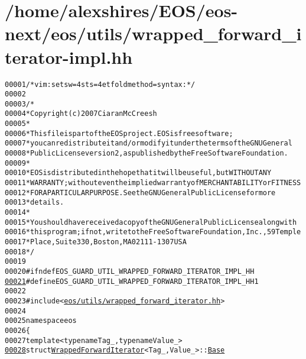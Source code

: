 \hypertarget{wrapped__forward__iterator-impl_8hh_source}{
\section{/home/alexshires/EOS/eos-\/next/eos/utils/wrapped\_\-forward\_\-iterator-\/impl.hh}
}


\begin{footnotesize}\begin{alltt}
00001 \textcolor{comment}{/* vim: set sw=4 sts=4 et foldmethod=syntax : */}
00002 
00003 \textcolor{comment}{/*}
00004 \textcolor{comment}{ * Copyright (c) 2007 Ciaran McCreesh}
00005 \textcolor{comment}{ *}
00006 \textcolor{comment}{ * This file is part of the EOS project. EOS is free software;}
00007 \textcolor{comment}{ * you can redistribute it and/or modify it under the terms of the GNU General}
00008 \textcolor{comment}{ * Public License version 2, as published by the Free Software Foundation.}
00009 \textcolor{comment}{ *}
00010 \textcolor{comment}{ * EOS is distributed in the hope that it will be useful, but WITHOUT ANY}
00011 \textcolor{comment}{ * WARRANTY; without even the implied warranty of MERCHANTABILITY or FITNESS}
00012 \textcolor{comment}{ * FOR A PARTICULAR PURPOSE.  See the GNU General Public License for more}
00013 \textcolor{comment}{ * details.}
00014 \textcolor{comment}{ *}
00015 \textcolor{comment}{ * You should have received a copy of the GNU General Public License along with}
00016 \textcolor{comment}{ * this program; if not, write to the Free Software Foundation, Inc., 59 Temple}
00017 \textcolor{comment}{ * Place, Suite 330, Boston, MA  02111-1307  USA}
00018 \textcolor{comment}{ */}
00019 
00020 \textcolor{preprocessor}{#ifndef EOS\_GUARD\_UTIL\_WRAPPED\_FORWARD\_ITERATOR\_IMPL\_HH}
\hypertarget{wrapped__forward__iterator-impl_8hh_source_l00021}{}\hyperlink{wrapped__forward__iterator-impl_8hh_af72bfca179e2f80dcfff5264bfeaa9fc}{00021} \textcolor{preprocessor}{}\textcolor{preprocessor}{#define EOS\_GUARD\_UTIL\_WRAPPED\_FORWARD\_ITERATOR\_IMPL\_HH 1}
00022 \textcolor{preprocessor}{}
00023 \textcolor{preprocessor}{#include <\hyperlink{wrapped__forward__iterator_8hh}{eos/utils/wrapped_forward_iterator.hh}>}
00024 
00025 \textcolor{keyword}{namespace }eos
00026 \{
00027     \textcolor{keyword}{template} <\textcolor{keyword}{typename} Tag\_, \textcolor{keyword}{typename} Value\_>
\hypertarget{wrapped__forward__iterator-impl_8hh_source_l00028}{}\hyperlink{structeos_1_1WrappedForwardIterator_1_1Base}{00028}     \textcolor{keyword}{struct }\hyperlink{classeos_1_1WrappedForwardIterator}{WrappedForwardIterator}<Tag\_, Value\_>::\hyperlink{structeos_1_1WrappedForwardIterator_1_1Base}{Base}

\end{alltt}
\end{footnotesize}
